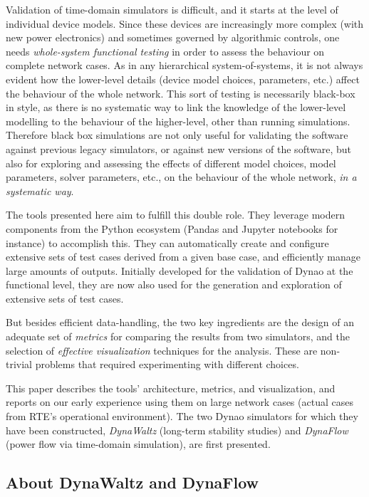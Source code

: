 \documentclass[conference]{IEEEtran}
\newcommand{\Dynawo}{Dyna\textomega o} %
\begin{document}
Validation of time-domain simulators is difficult, and it starts at the level
of individual device models. Since these devices are increasingly more
complex (with new power electronics) and sometimes governed by
algorithmic controls, one needs \emph{whole-system functional testing} in order
to assess the behaviour on complete network cases. As in any hierarchical
system-of-systems, it is not always evident how the lower-level details (device
model choices, parameters, etc.)  affect the behaviour of the whole network. This
sort of testing is necessarily black-box in style, as there is no systematic
way to link the knowledge of the lower-level modelling to the behaviour of the
higher-level, other than running simulations.  Therefore black box
simulations are not only useful for validating the software against previous
legacy simulators, or against new versions of the software, but also for
exploring and assessing the effects of different model choices, model
parameters, solver parameters, etc., on the behaviour of the whole network,
\emph{in a systematic way}.

The tools presented here aim to fulfill this double role. They leverage modern
components from the Python ecosystem (Pandas and Jupyter notebooks for instance)
to accomplish this. They can automatically create and configure extensive sets
of test cases derived from a given base case, and efficiently manage large
amounts of outputs. Initially developed for the validation of \Dynawo{} at the
functional level, they are now also used for the generation and exploration of
extensive sets of test cases.

But besides efficient data-handling, the two key ingredients are the design of
an adequate set of \emph{metrics} for comparing the results from two simulators,
and the selection of \emph{effective visualization} techniques for the analysis.
These are non-trivial problems that required experimenting with different
choices.

This paper describes the tools' architecture, metrics, and visualization, and
reports on our early experience using them on large network cases (actual cases
from RTE's operational environment). The two \Dynawo{} simulators for which they
have been constructed, \emph{DynaWaltz} (long-term stability studies) and
\emph{DynaFlow} (power flow via time-domain simulation), are first presented.



\subsection{About DynaWaltz and DynaFlow}
\end{document}
